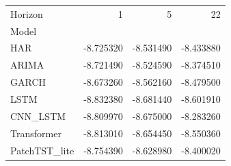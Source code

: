 \begin{tabular}{lrrr}
\toprule
Horizon & 1 & 5 & 22 \\
Model &  &  &  \\
\midrule
HAR & -8.725320 & -8.531490 & -8.433880 \\
ARIMA & -8.721490 & -8.524590 & -8.374510 \\
GARCH & -8.673260 & -8.562160 & -8.479500 \\
LSTM & -8.832380 & -8.681440 & -8.601910 \\
CNN_LSTM & -8.809970 & -8.675000 & -8.283260 \\
Transformer & -8.813010 & -8.654450 & -8.550360 \\
PatchTST_lite & -8.754390 & -8.628980 & -8.400020 \\
\bottomrule
\end{tabular}
